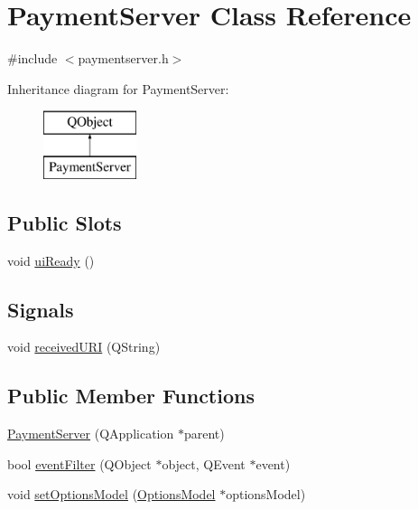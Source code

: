 \hypertarget{class_payment_server}{}\section{Payment\+Server Class Reference}
\label{class_payment_server}


{\ttfamily \#include $<$paymentserver.\+h$>$}

Inheritance diagram for Payment\+Server\+:\begin{figure}[H]
\begin{center}
\leavevmode
\includegraphics[height=2.000000cm]{class_payment_server}
\end{center}
\end{figure}
\subsection*{Public Slots}
\begin{DoxyCompactItemize}
\item 
void \hyperlink{class_payment_server_abb6c65fabbf97ba95381997ca9cd6993}{ui\+Ready} ()
\end{DoxyCompactItemize}
\subsection*{Signals}
\begin{DoxyCompactItemize}
\item 
void \hyperlink{class_payment_server_a19c9f0cb2b54808914f07f9814547ed4}{received\+U\+R\+I} (Q\+String)
\end{DoxyCompactItemize}
\subsection*{Public Member Functions}
\begin{DoxyCompactItemize}
\item 
\hyperlink{class_payment_server_a81890a279d57e2af7b94a5f32f7ded8c}{Payment\+Server} (Q\+Application $\ast$parent)
\item 
bool \hyperlink{class_payment_server_af795e3c318556c833792e530b279efc9}{event\+Filter} (Q\+Object $\ast$object, Q\+Event $\ast$event)
\item 
void \hyperlink{class_payment_server_a468fb163f5172c8428c434631aeb4132}{set\+Options\+Model} (\hyperlink{class_options_model}{Options\+Model} $\ast$options\+Model)
\end{DoxyCompactItemize}
